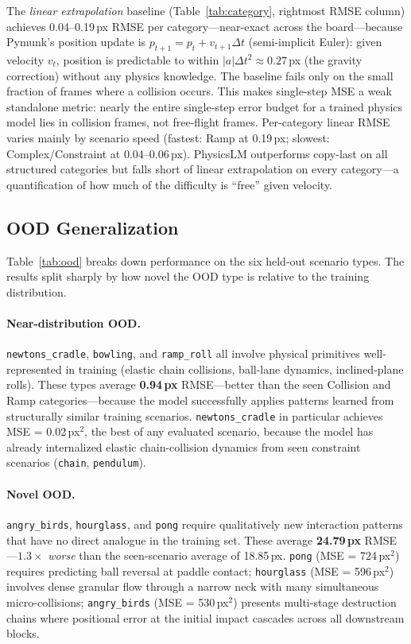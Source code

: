 \documentclass{article}
\begin{document}
The \emph{linear extrapolation} baseline (Table~\ref{tab:category}, rightmost RMSE column)
achieves 0.04--0.19\,px RMSE per category---near-exact across the board---because
Pymunk's position update is $p_{t+1} = p_t + v_{t+1}\Delta t$ (semi-implicit Euler):
given velocity $v_t$, position is predictable to within $|a|\Delta t^2 \approx 0.27$\,px
(the gravity correction) without any physics knowledge. The baseline fails only on the
small fraction of frames where a collision occurs. This makes single-step MSE a weak
standalone metric: nearly the entire single-step error budget for a trained physics
model lies in collision frames, not free-flight frames. Per-category linear RMSE
varies mainly by scenario speed (fastest: Ramp at 0.19\,px; slowest: Complex/Constraint
at 0.04--0.06\,px). PhysicsLM outperforms copy-last on all structured categories but
falls short of linear extrapolation on every category---a quantification of how much
of the difficulty is ``free'' given velocity.

\subsection{OOD Generalization}

Table~\ref{tab:ood} breaks down performance on the six held-out scenario types.
The results split sharply by how novel the OOD type is relative to the training
distribution.

\paragraph{Near-distribution OOD.}
\texttt{newtons\_cradle}, \texttt{bowling}, and \texttt{ramp\_roll} all involve
physical primitives well-represented in training (elastic chain collisions,
ball-lane dynamics, inclined-plane rolls). These types average \textbf{0.94\,px}
RMSE---better than the seen Collision and Ramp categories---because the model
successfully applies patterns learned from structurally similar training scenarios.
\texttt{newtons\_cradle} in particular achieves MSE = 0.02\,px$^2$, the best of
any evaluated scenario, because the model has already internalized elastic
chain-collision dynamics from seen constraint scenarios (\texttt{chain},
\texttt{pendulum}).

\paragraph{Novel OOD.}
\texttt{angry\_birds}, \texttt{hourglass}, and \texttt{pong} require qualitatively
new interaction patterns that have no direct analogue in the training set.
These average \textbf{24.79\,px} RMSE---$1.3\times$ \emph{worse} than the
seen-scenario average of 18.85\,px. \texttt{pong} (MSE = 724\,px$^2$) requires
predicting ball reversal at paddle contact; \texttt{hourglass} (MSE = 596\,px$^2$)
involves dense granular flow through a narrow neck with many simultaneous
micro-collisions; \texttt{angry\_birds} (MSE = 530\,px$^2$) presents multi-stage
destruction chains where positional error at the initial impact cascades across
all downstream blocks.
\end{document}
